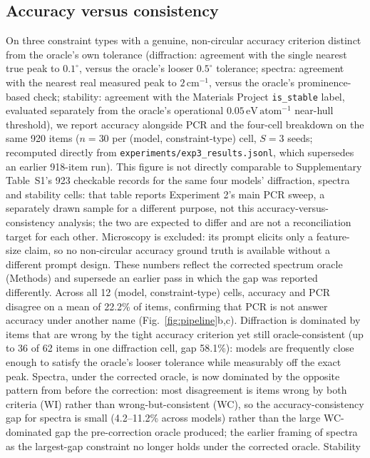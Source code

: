 \documentclass[pdflatex,sn-nature]{sn-jnl}
\begin{document}
\subsection*{Accuracy versus consistency}
On three constraint types with a genuine, non-circular accuracy criterion distinct
from the oracle's own tolerance (diffraction: agreement with the single nearest true
peak to $0.1^{\circ}$, versus the oracle's looser $0.5^{\circ}$ tolerance; spectra:
agreement with the nearest real measured peak to $2\,\mathrm{cm}^{-1}$, versus the
oracle's prominence-based check; stability: agreement with the Materials
Project \texttt{is\_stable} label, evaluated separately from the oracle's
operational $0.05\,\mathrm{eV\,atom^{-1}}$ near-hull threshold), we report
accuracy alongside PCR and the four-cell breakdown on the same
920 items ($n=30$ per (model, constraint-type) cell, $S=3$ seeds; recomputed directly from
\texttt{experiments/exp3\_results.jsonl}, which supersedes an earlier 918-item run). This
figure is not directly comparable to Supplementary Table~S1's 923 checkable records for the
same four models' diffraction, spectra and stability cells: that table reports Experiment 2's
main PCR sweep, a separately drawn sample for a different purpose, not this accuracy-versus-
consistency analysis; the two are expected to differ and are not a reconciliation target for
each other. Microscopy is excluded: its
prompt elicits only a feature-size claim, so no non-circular accuracy ground truth is
available without a different prompt design. These numbers reflect the corrected
spectrum oracle (Methods) and supersede an earlier pass in which the gap was reported
differently. Across all 12 (model, constraint-type) cells,
accuracy and PCR disagree on a mean of 22.2\% of items, confirming that PCR is not
answer accuracy under another name (Fig.~\ref{fig:pipeline}b,c). Diffraction is dominated by items
that are wrong by the tight accuracy criterion yet still oracle-consistent (up to 36
of 62 items in one diffraction cell, gap 58.1\%): models are frequently close enough to satisfy the
oracle's looser tolerance while measurably off the exact peak. Spectra, under the corrected
oracle, is now dominated by the opposite pattern from before the correction: most
disagreement is items wrong by both criteria (WI) rather than wrong-but-consistent (WC),
so the accuracy-consistency gap for spectra is small (4.2--11.2\% across models) rather
than the large WC-dominated gap the pre-correction oracle produced; the earlier framing of
spectra as the largest-gap constraint no longer holds under the corrected oracle. Stability
\end{document}
